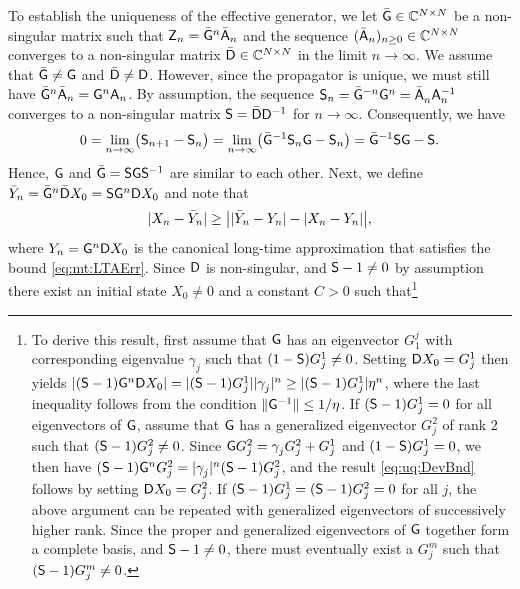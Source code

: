 \documentclass[aps,prl,reprint]{revtex4-2}
\begin{document}
To establish the uniqueness of the effective generator, we let $\bar{\mathsf{G}}\in\mathbb{C}^{N\times N}$ be a non-singular matrix such that $\mathsf{Z}_n = \bar{\mathsf{G}}^n\bar{\mathsf{A}}_n$ and the sequence $(\bar{\mathsf{A}}_n)_{n\geq 0}\in\mathbb{C}^{N\times N}$ converges to a non-singular matrix $\bar{\mathsf{D}}\in\mathbb{C}^{N\times N}$ in the limit $n\rightarrow\infty$.
We assume that $\bar{\mathsf{G}}\neq\mathsf{G}$ and $\bar{\mathsf{D}}\neq\mathsf{D}$.
However, since the propagator is unique, we must still have $\bar{\mathsf{G}}^n\bar{\mathsf{A}}_n = \mathsf{G}^n\mathsf{A}_n$.
By assumption, the sequence $\mathsf{S}_n = \bar{\mathsf{G}}^{-n}\mathsf{G}^n=\bar{\mathsf{A}}_n^{\vphantom{1}}\mathsf{A}^{-1}_n$ converges to a non-singular matrix $\mathsf{S} = \bar{\mathsf{D}}\mathsf{D}^{-1}$ for $n\rightarrow\infty$.
Consequently, we have
\begin{equation}
0 = \lim_{n\rightarrow\infty}\bigl(\mathsf{S}_{n+1}-\mathsf{S}_n\bigr)
= \lim_{n\rightarrow\infty}\bigl(\bar{\mathsf{G}}^{-1}\mathsf{S}_n\mathsf{G} - \mathsf{S}_n\bigr)
= \bar{\mathsf{G}}^{-1}\mathsf{S}\mathsf{G} - \mathsf{S}.
\end{equation}
Hence, $\mathsf{G}$ and $\bar{\mathsf{G}}=\mathsf{S}\mathsf{G}\mathsf{S}^{-1}$ are similar to each other.
Next, we define $\bar{Y}_n = \bar{\mathsf{G}}^n\bar{\mathsf{D}}X_0= \mathsf{S}\mathsf{G}^n\mathsf{D} X_0$ and note that
\begin{equation}\label{eq:uq:SubBnd}
\lvert X_n-\bar{Y}_n \rvert\geq \bigl|\lvert \bar{Y}_n-Y_n \rvert-\lvert X_n-Y_n \rvert\bigr|,
\end{equation}
where $Y_n = \mathsf{G}^n\mathsf{D} X_0$ is the canonical long-time approximation that satisfies the bound \eqref{eq:mt:LTAErr}.
Since $\mathsf{D}$ is non-singular, and $\mathsf{S}-1 \neq 0$ by assumption there exist an initial state $X_0\neq 0$ and a constant $C>0$ such that\footnote{To derive this result, first assume that $\mathsf{G}$ has an eigenvector $G^j_1$ with corresponding eigenvalue $\gamma_j$ such that $(1-\mathsf{S})G^1_j\neq0$.
	Setting $\mathsf{D} X_0 = G^1_j$ then yields $ \lvert (\mathsf{S}-1)\mathsf{G}^n\mathsf{D} X_0 \rvert= \lvert (\mathsf{S}-1)G^1_j \rvert\lvert \gamma_j^{\vphantom{1}} \rvert^n \geq \lvert (\mathsf{S}-1)G^1_j \rvert\eta^n$,
	where the last inequality follows from the condition $\lVert \mathsf{G}^{-1} \rVert\leq 1/\eta$.
	If $(\mathsf{S}-1)G^1_j=0$ for all eigenvectors of $\mathsf{G}$, assume that $\mathsf{G}$ has a generalized eigenvector $G^2_j$ of rank $2$ such that $(\mathsf{S}-1)G^2_j\neq 0$.
	Since $\mathsf{G} G^2_j = \gamma^{\vphantom{1}}_jG^2_j+G^1_j$ and $(1-\mathsf{S})G^1_j =0$, we then have $(\mathsf{S}-1)\mathsf{G}^n G^2_j = \lvert \gamma^{\vphantom{1}}_j \rvert^n(\mathsf{S}-1)G^2_j$, and the result \eqref{eq:uq:DevBnd} follows by setting $\mathsf{D} X_0 = G^2_j$.
	If $(\mathsf{S}-1)G^1_j = (\mathsf{S}-1)G^2_j =0$ for all $j$, the above argument can be repeated with generalized eigenvectors of successively higher rank.
	Since the proper and generalized eigenvectors of $\mathsf{G}$ together form a complete basis, and $\mathsf{S}-1\neq 0$, there must eventually exist a $G^m_j$ such that $(\mathsf{S}-1)G^m_j \neq 0$.
}
\end{document}
